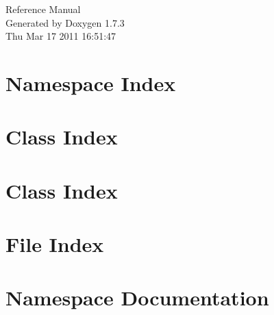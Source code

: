 \documentclass[a4paper]{book}
\begin{document}
\hypersetup{pageanchor=false}
\begin{titlepage}
\vspace*{7cm}
\begin{center}
{\Large Reference Manual}\\
\vspace*{1cm}
{\large Generated by Doxygen 1.7.3}\\
\vspace*{0.5cm}
{\small Thu Mar 17 2011 16:51:47}\\
\end{center}
\end{titlepage}
\clearemptydoublepage
{}
\tableofcontents
\clearemptydoublepage
{}
\hypersetup{pageanchor=true}
\chapter{Namespace Index}

\chapter{Class Index}

\chapter{Class Index}

\chapter{File Index}

\chapter{Namespace Documentation}

\end{document}
